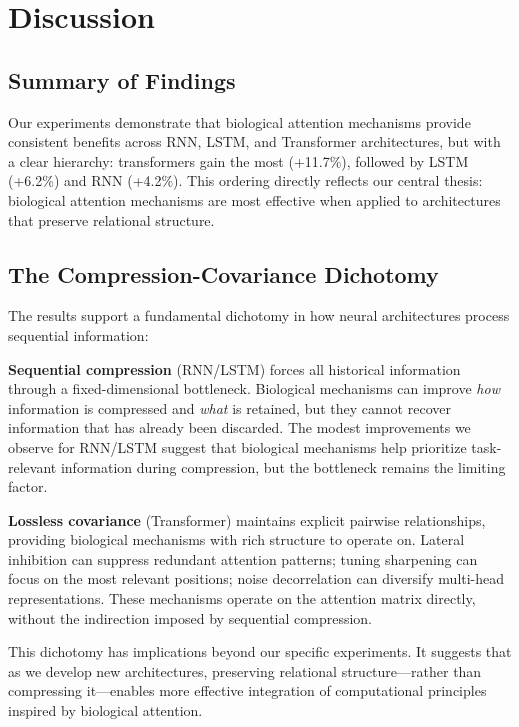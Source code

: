 \section{Discussion}

\subsection{Summary of Findings}

Our experiments demonstrate that biological attention mechanisms provide consistent benefits across RNN, LSTM, and Transformer architectures, but with a clear hierarchy: transformers gain the most (+11.7\%), followed by LSTM (+6.2\%) and RNN (+4.2\%). This ordering directly reflects our central thesis: biological attention mechanisms are most effective when applied to architectures that preserve relational structure.

\subsection{The Compression-Covariance Dichotomy}

The results support a fundamental dichotomy in how neural architectures process sequential information:

\textbf{Sequential compression} (RNN/LSTM) forces all historical information through a fixed-dimensional bottleneck. Biological mechanisms can improve \textit{how} information is compressed and \textit{what} is retained, but they cannot recover information that has already been discarded. The modest improvements we observe for RNN/LSTM suggest that biological mechanisms help prioritize task-relevant information during compression, but the bottleneck remains the limiting factor.

\textbf{Lossless covariance} (Transformer) maintains explicit pairwise relationships, providing biological mechanisms with rich structure to operate on. Lateral inhibition can suppress redundant attention patterns; tuning sharpening can focus on the most relevant positions; noise decorrelation can diversify multi-head representations. These mechanisms operate on the attention matrix directly, without the indirection imposed by sequential compression.

This dichotomy has implications beyond our specific experiments. It suggests that as we develop new architectures, preserving relational structure---rather than compressing it---enables more effective integration of computational principles inspired by biological attention.

